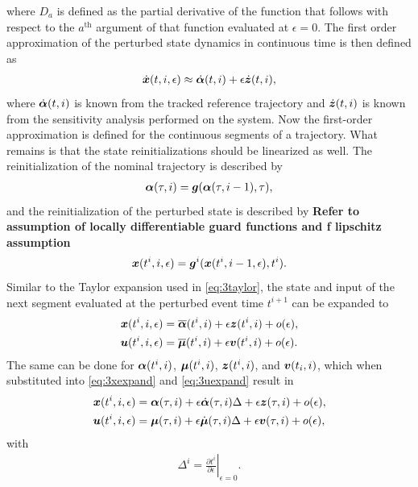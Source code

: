\documentclass[../DC2017114Bouma.tex]{subfiles}
\begin{document}
where $D_a$ is defined as the partial derivative of the function that follows with respect to the $a^{\text{th}}$ argument of that function evaluated at $\epsilon = 0$. The first order approximation of the perturbed state dynamics in continuous time is then defined as
\begin{align}
\dot{{\boldsymbol{x}}}(t,i,\epsilon) \approx \dot{\boldsymbol{\alpha}}(t,i) + \epsilon\dot{{\boldsymbol{z}}}(t,i),
\end{align}
where $\dot{\boldsymbol{\alpha}}(t,i)$ is known from the tracked reference trajectory and $\dot{{\boldsymbol{z}}}(t,i)$ is known from the sensitivity analysis performed on the system. Now the first-order approximation is defined for the continuous segments of a trajectory. What remains is that the state reinitializations should be linearized as well. The reinitialization of the nominal trajectory is described by
\begin{align}
\boldsymbol{\alpha}(\tau,i) = {\boldsymbol{g}}(\boldsymbol{\alpha}(\tau,i-1),\tau),\label{eq:3g}
\end{align}
and the reinitialization of the perturbed state is described by
\textbf{Refer to assumption of locally differentiable guard functions and f lipschitz assumption}
\begin{align}
{\boldsymbol{x}}(t^{i},i,\epsilon) = {\boldsymbol{g}}^i({\boldsymbol{x}}(t^{i},i-1,\epsilon),t^{i}).
\end{align}
Similar to the Taylor expansion used in \eqref{eq:3taylor}, the state and input of the next segment evaluated at the perturbed event time $t^{i+1}$ can be expanded to
\begin{align}
{\boldsymbol{x}}(t^{i},i,\epsilon) &= \overline{\boldsymbol{\alpha}}(t^{i},i) + \epsilon{\boldsymbol{z}}(t^{i},i) + o(\epsilon),\label{eq:3xexpand}\\
{\boldsymbol{u}}(t^{i},i,\epsilon) &= \overline{\boldsymbol{\mu}}(t^{i},i) + \epsilon{\boldsymbol{v}}(t^{i},i) + o(\epsilon).\label{eq:3uexpand}
\end{align}
The same can be done for $\boldsymbol{\alpha}(t^{i},i)$, $\boldsymbol{\mu}(t^{i},i)$, ${\boldsymbol{z}}(t^{i},i)$, and ${\boldsymbol{v}}(t_{i},i)$, which when substituted into \eqref{eq:3xexpand} and \eqref{eq:3uexpand} result in
\begin{align}
{\boldsymbol{x}}(t^{i},i,\epsilon) &= \boldsymbol{\alpha}(\tau,i) + \epsilon\dot{\boldsymbol{\alpha}}(\tau,i)\Delta + \epsilon{\boldsymbol{z}}(\tau,i) + o(\epsilon),\label{eq:3xexpand2}\\
{\boldsymbol{u}}(t^{i},i,\epsilon) &= \boldsymbol{\mu}(\tau,i) + \epsilon\dot{\boldsymbol{\mu}}(\tau,i)\Delta + \epsilon{\boldsymbol{v}}(\tau,i) + o(\epsilon),\label{eq:3uexpand2}
\end{align}
with
\begin{align}
\Delta^{i} = \left.\frac{\partial t^{i}}{\partial\epsilon}\right|_{\epsilon=0}.\label{eq:3Delta}
\end{align}
\end{document}
